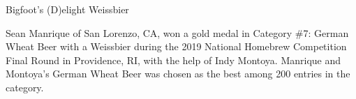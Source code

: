 \stylesection{\styleweissbier}

\begin{recipe}{Bigfoot's (D)elight Weissbier}

\begin{aboutblock}
Sean Manrique of San Lorenzo, CA, won a gold medal in Category \#7: German Wheat
Beer with a Weissbier during the 2019 National Homebrew Competition Final Round
in Providence, RI, with the help of Indy Montoya. Manrique and Montoya's German
Wheat Beer was chosen as the best among 200 entries in the category.
\sourceaha
\end{aboutblock}


\begin{methodandtiming}
 
\begin{mashsteps}
\end{mashsteps}

\begin{fermentationsteps}
\end{fermentationsteps}

\end{methodandtiming}

\recipebreak

\begin{ingredientsblock}

\begin{malts}
\end{malts}

\begin{hops}
\end{hops}


\end{ingredientsblock}

\end{recipe}

